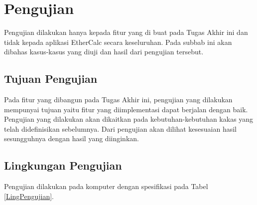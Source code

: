 \section{Pengujian}
Pengujian dilakukan hanya kepada fitur yang di buat pada Tugas Akhir ini dan tidak kepada aplikasi EtherCalc secara keseluruhan. Pada subbab ini akan dibahas kasus-kasus yang diuji dan hasil dari pengujian tersebut.

\subsection{Tujuan Pengujian}
Pada fitur yang dibangun pada Tugas Akhir ini, pengujian yang dilakukan mempunyai tujuan yaitu fitur yang diimplementasi dapat berjalan dengan baik. Pengujian yang dilakukan akan dikaitkan pada kebutuhan-kebutuhan kakas yang telah didefinisikan sebelumnya. Dari pengujian akan dilihat kesesuaian hasil sesungguhnya dengan hasil yang diinginkan.


\subsection{Lingkungan Pengujian}
Pengujian dilakukan pada komputer dengan spesifikasi pada Tabel \ref{LingPengujian}.


